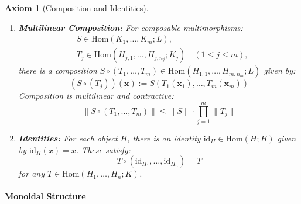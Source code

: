 \documentclass[11pt]{article}
\newtheorem{axiom}{Axiom}
\begin{document}
\begin{axiom}[Composition and Identities]\label{ax:H3-H4}
\begin{enumerate}[label=(\alph*)]
    \item \textbf{Multilinear Composition:} For composable multimorphisms:
    \begin{align*}
        &S \in \mathrm{Hom}(K_1,\dots,K_m;L), \\
        &T_j \in \mathrm{Hom}(H_{j,1},\dots,H_{j,n_j};K_j) \quad (1\le j\le m),
    \end{align*}
    there is a composition $S\circ (T_1,\dots,T_m) \in \mathrm{Hom}(H_{1,1},\dots,H_{m,n_m};L)$ given by:
    \[
    (S\circ (T_j))(\mathbf{x}) := S(T_1(\mathbf{x}_1),\dots,T_m(\mathbf{x}_m))
    \]
    Composition is multilinear and contractive:
    \[
    \|S\circ(T_1,\dots,T_m)\| \le \|S\|\cdot\prod_{j=1}^m \|T_j\|
    \]
    
    \item \textbf{Identities:} For each object $H$, there is an identity $\mathrm{id}_H \in \mathrm{Hom}(H;H)$ given by $\mathrm{id}_H(x) = x$. These satisfy:
    \[
    T \circ (\mathrm{id}_{H_1}, \dots, \mathrm{id}_{H_n}) = T
    \]
    for any $T \in \mathrm{Hom}(H_1,\dots,H_n;K)$.
\end{enumerate}
\end{axiom}

\paragraph{Monoidal Structure}
\end{document}
